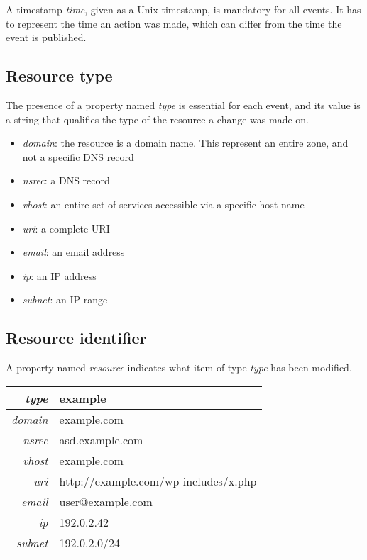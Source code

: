 \documentclass[conference]{IEEEtran}
\begin{document}
A timestamp \emph{time}, given as a Unix timestamp, is mandatory for all events. It has to represent the time an action was made, which can differ from the time the event is published.

\subsection{Resource type}

The presence of a property named \emph{type} is essential for each event, and its value is a string that qualifies the type of the resource a change was made on.

\begin{itemize}
	\item \emph{domain}: the resource is a domain name. This represent an entire zone, and not a specific DNS record
	\item \emph{nsrec}: a DNS record
	\item \emph{vhost}: an entire set of services accessible via a specific host name
	\item \emph{uri}: a complete URI
	\item \emph{email}: an email address
	\item \emph{ip}: an IP address
	\item \emph{subnet}: an IP range
\end{itemize}

\subsection{Resource identifier}

A property named \emph{resource} indicates what item of type \emph{type} has been modified.

\vspace{1em}
\begin{tabular}{ r | l }
\hline
\emph{type} & example\\ \hline
\hline
\emph{domain} & example.com \\ \hline
\emph{nsrec} & asd.example.com \\ \hline
\emph{vhost} & example.com \\ \hline
\emph{uri} & http://example.com/wp-includes/x.php	\\ \hline
\emph{email} & user@example.com	\\ \hline
\emph{ip} & 192.0.2.42 \\ \hline
\emph{subnet} & 192.0.2.0/24 \\ \hline
\end{tabular}
\vspace{1em}
\end{document}
